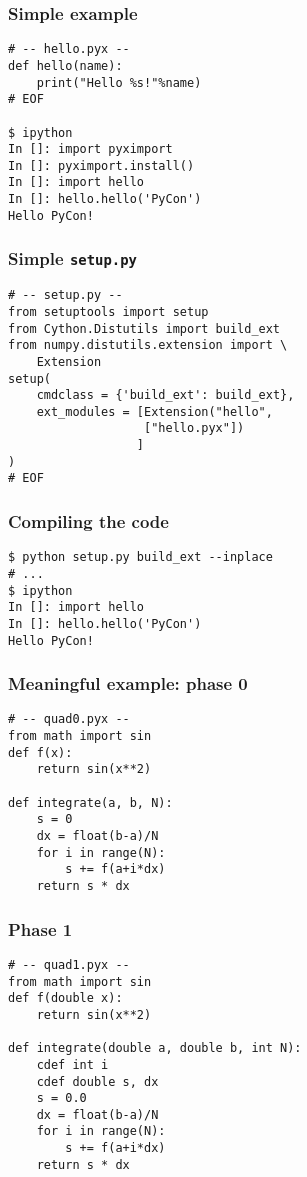 \documentclass[14pt,compress]{beamer}
\newcommand{\typ}[1]{\lstinline{#1}}
\begin{document}
\begin{frame}[fragile]
    \frametitle{Simple example}
\begin{lstlisting}
# -- hello.pyx --
def hello(name):
    print("Hello %s!"%name)
# EOF

$ ipython
In []: import pyximport
In []: pyximport.install()
In []: import hello
In []: hello.hello('PyCon')
Hello PyCon!
\end{lstlisting}

\end{frame}

\begin{frame}[fragile]
    \frametitle{Simple \typ{setup.py}}
\begin{lstlisting}
# -- setup.py --
from setuptools import setup
from Cython.Distutils import build_ext
from numpy.distutils.extension import \ 
    Extension
setup(
    cmdclass = {'build_ext': build_ext},
    ext_modules = [Extension("hello", 
                   ["hello.pyx"])
                  ]
)
# EOF
\end{lstlisting}

\end{frame}

\begin{frame}[fragile]
    \frametitle{Compiling the code}
\begin{lstlisting}
$ python setup.py build_ext --inplace
# ...
$ ipython
In []: import hello
In []: hello.hello('PyCon')
Hello PyCon!
\end{lstlisting}

\end{frame}

\begin{frame}[fragile]
    \frametitle{Meaningful example: phase 0}
\begin{lstlisting}
# -- quad0.pyx --
from math import sin
def f(x):
    return sin(x**2)

def integrate(a, b, N):
    s = 0
    dx = float(b-a)/N
    for i in range(N):
        s += f(a+i*dx)
    return s * dx
\end{lstlisting}

\end{frame}

\begin{frame}[fragile]
    \frametitle{Phase 1}
\begin{lstlisting}
# -- quad1.pyx --
from math import sin
def f(double x):
    return sin(x**2)

def integrate(double a, double b, int N):
    cdef int i
    cdef double s, dx
    s = 0.0
    dx = float(b-a)/N
    for i in range(N):
        s += f(a+i*dx)
    return s * dx
\end{lstlisting}

\end{frame}
\end{document}
